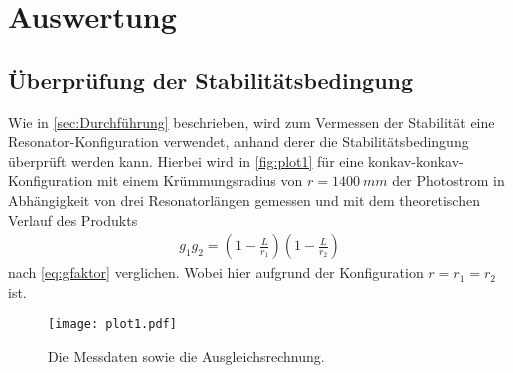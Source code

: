 \section{Auswertung}
\label{sec:Auswertung}

\subsection{Überprüfung der Stabilitätsbedingung} \label{sec:stabilitaet}
Wie in \autoref{sec:Durchführung} beschrieben, 
wird zum Vermessen der Stabilität eine Resonator-Konfiguration verwendet,
anhand derer die Stabilitätsbedingung überprüft werden kann.
Hierbei wird in \autoref{fig:plot1} für eine konkav-konkav-Konfiguration mit einem Krümmungsradius von $r = \qty{1400}{mm}$ der Photostrom in Abhängigkeit von drei Resonatorlängen gemessen
und mit dem theoretischen Verlauf des Produkts 
\begin{align*}
    g_1 g_2 = \left(1 - \frac{L}{r_1}\right)\left(1 - \frac{L}{r_2}\right)
\end{align*}
nach \autoref{eq:gfaktor} verglichen. Wobei hier aufgrund der Konfiguration $r = r_1 = r_2$ ist.
\begin{figure}[h]
    \centering
    \texttt{[image: plot1.pdf]}
    \caption{Die Messdaten sowie die Ausgleichsrechnung.}
    \label{fig:plot1}
\end{figure}

